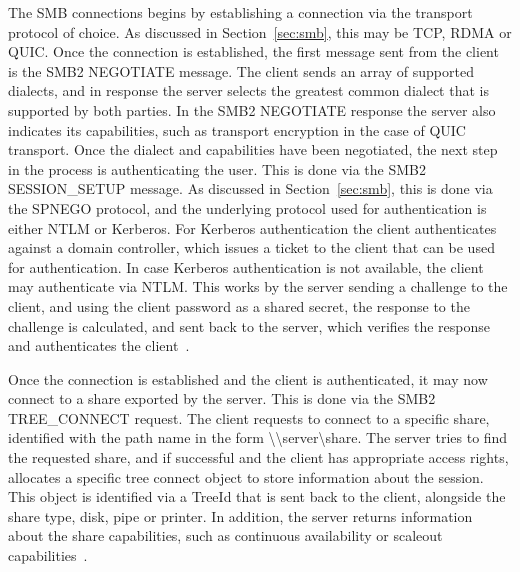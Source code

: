 \documentclass[english, 12pt, a4paper, elec, utf8, a-2b, online]{aaltothesis}
\begin{document}
The SMB connections begins by establishing a connection via the transport protocol
of choice. As discussed in Section~\ref{sec:smb}, this may be TCP, RDMA or QUIC.
Once the connection is established, the first message sent from the client is
the SMB2 NEGOTIATE message. The client sends an array of supported dialects,
and in response the server selects the greatest common dialect that is supported
by both parties. In the SMB2 NEGOTIATE response the server also indicates its capabilities,
such as transport encryption in the case of QUIC transport. Once the dialect and
capabilities have been negotiated, the next step in the process is authenticating
the user. This is done via the SMB2 SESSION\_SETUP message. As discussed in Section~\ref{sec:smb},
this is done via the SPNEGO protocol, and the underlying protocol used for authentication
is either NTLM or Kerberos. For Kerberos authentication the client authenticates
against a domain controller, which issues a ticket to the client that can be used for
authentication. In case Kerberos authentication is not available, the client may
authenticate via NTLM. This works by the server sending a challenge to the client,
and using the client password as a shared secret, the response to the challenge is
calculated, and sent back to the server, which verifies the response and authenticates
the client~\cite{smb2_tech}.

Once the connection is established and the client is authenticated, it may now connect
to a share exported by the server. This is done via the SMB2 TREE\_CONNECT request.
The client requests to connect to a specific share, identified with the path name
in the form {\textbackslash\textbackslash}server{\textbackslash}share. The server
tries to find the requested share, and if successful and the client has appropriate
access rights, allocates a specific tree connect object to store information about the session.
This object is identified via a TreeId that is sent back to the client, alongside
the share type, disk, pipe or printer. In addition,
the server returns information about the share capabilities, such as continuous availability
or scaleout capabilities~\cite{smb2_tech}.
\end{document}
